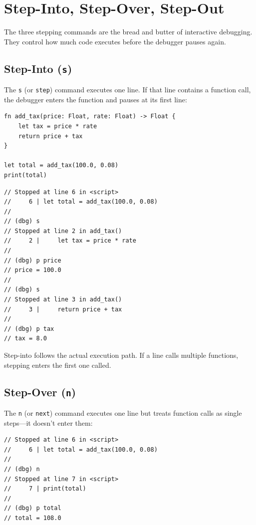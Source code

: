 \section{Step-Into, Step-Over, Step-Out}\label{sec:stepping}

The three stepping commands are the bread and butter of interactive debugging.
They control how much code executes before the debugger pauses again.

\subsection{Step-Into (\texttt{s})}\label{sec:step-into}

The \lstinline|s| (or \lstinline|step|) command executes one line.
If that line contains a function call, the debugger enters the function and pauses at its first line:

\begin{lstlisting}[language=Lattice, caption={A simple program to step through}]
fn add_tax(price: Float, rate: Float) -> Float {
    let tax = price * rate
    return price + tax
}

let total = add_tax(100.0, 0.08)
print(total)
\end{lstlisting}

\begin{lstlisting}[language=Lattice, caption={Stepping into a function call}]
// Stopped at line 6 in <script>
//     6 | let total = add_tax(100.0, 0.08)
//
// (dbg) s
// Stopped at line 2 in add_tax()
//     2 |     let tax = price * rate
//
// (dbg) p price
// price = 100.0
//
// (dbg) s
// Stopped at line 3 in add_tax()
//     3 |     return price + tax
//
// (dbg) p tax
// tax = 8.0
\end{lstlisting}

Step-into follows the actual execution path.
If a line calls multiple functions, stepping enters the first one called.

\subsection{Step-Over (\texttt{n})}\label{sec:step-over}

The \lstinline|n| (or \lstinline|next|) command executes one line but treats function calls as single steps---it doesn't enter them:

\begin{lstlisting}[language=Lattice, caption={Stepping over a function call}]
// Stopped at line 6 in <script>
//     6 | let total = add_tax(100.0, 0.08)
//
// (dbg) n
// Stopped at line 7 in <script>
//     7 | print(total)
//
// (dbg) p total
// total = 108.0
\end{lstlisting}

